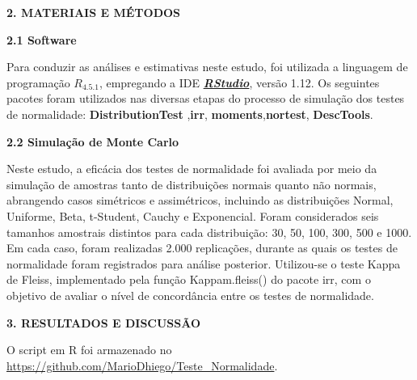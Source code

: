 \documentclass[final]{beamer}
\begin{document}
\begin{frame}[t]
\begin{columns}[t,totalwidth=0.6\paperwidth]
\begin{column}{0.45\paperwidth}
\vspace{1.3cm}
{\large\bfseries 2. MATERIAIS E MÉTODOS}\par
\justifying
\vspace{1.3cm}

{\large\bfseries 2.1 Software}\par

Para conduzir as análises e estimativas neste estudo, foi utilizada a linguagem de programação \textbf{$R_{4.5.1}$}, empregando a IDE \href{https://posit.co/download/rstudio-desktop/}{\textit{\textbf{RStudio}}}, versão 1.12. Os seguintes pacotes foram utilizados nas diversas etapas do processo de simulação dos testes de normalidade: \textbf{DistributionTest} ,\textbf{irr}, \textbf{moments},\textbf{nortest}, \textbf{DescTools}.  

\vspace{1.3cm}
{\large\bfseries 2.2 Simulação de Monte Carlo}\par

Neste estudo, a eficácia dos testes de normalidade foi avaliada por meio da simulação de amostras tanto de distribuições normais quanto não normais, abrangendo casos simétricos e assimétricos, incluindo as distribuições Normal, Uniforme, Beta, t-Student, Cauchy e Exponencial. Foram considerados seis tamanhos amostrais distintos para cada distribuição: 30, 50, 100, 300,
500 e 1000. Em cada caso, foram realizadas 2.000 replicações, durante as quais os testes de normalidade foram registrados para análise posterior. Utilizou-se o teste Kappa de Fleiss, implementado pela função Kappam.fleiss() do pacote irr, com o objetivo de avaliar o nível de concordância entre os testes de normalidade.



 \vspace{1em}
{\large\bfseries 3. RESULTADOS E DISCUSSÃO}\par
\justifying
\vspace{1.3cm}

O script em R foi armazenado no \href{https://github.com/MarioDhiego/Teste_Normalidade}{https://github.com/MarioDhiego/Teste\_Normalidade}.

\vspace{0.5cm}



\end{column}
\end{columns}
\end{frame}
\end{document}
